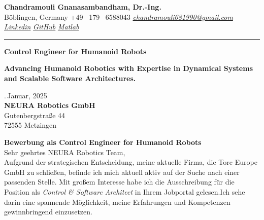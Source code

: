 \documentclass[a4paper,10pt]{article}
\newcommand{\link}[1]{{\textit{#1}}}
\begin{document}
\thispagestyle{plain}

\begin{center}
    {\Large \textbf{Chandramouli Gnanasambandham, Dr.-Ing.}}\\ 
    
    \vspace{0.2cm}
    \small B\"oblingen, Germany \hfill  \bullet  \hfill  +49 \ 179 \ 6588043 \hfill \bullet  \hfill
    \textup{\href{mailto:chandramouli681990@gmail.com}{\link{chandramouli681990@gmail.com}}} \hfill \bullet \hfill
    \textup{\href{https://linkedin.com/in/ganasambandhamc}{\link{Linkedin}}} \hfill \bullet \hfill
    \textup{\href{https://github.com/chandramouli6890}{\link{GitHub}}} \hfill \bullet \hfill
    \textup{\href{https://de.mathworks.com/matlabcentral/profile/authors/4267772}{\link{Matlab}}}

    \vspace{-0.2cm}
    {\rule{\linewidth}{0.8pt}}

    \vspace{0.2cm}
    {\Large \textbf{Control Engineer for Humanoid Robots}}
    
    \vspace{0.1cm}
    \colorbox{gray!40}{%
        \parbox{0.99\textwidth}{%
            \centering \textcolor{highlightcolor}{\textbf{Advancing Humanoid Robotics with Expertise in Dynamical Systems and Scalable Software Architectures.}}
        }%
    }
\end{center}

\vspace{0.5cm}
.\,Januar, 2025\\

{\noindent
    \textbf{NEURA Robotics GmbH}\\
Gutenbergstraße 44\\
72555 Metzingen\\ 
}

\noindent \textbf{Bewerbung als Control Engineer for Humanoid Robots} \\

\noindent Sehr geehrtes NEURA Robotics Team,\\

\noindent Aufgrund der strategischen Entscheidung, meine aktuelle Firma, die
Torc Europe GmbH zu schließen, befinde ich mich aktuell aktiv auf der Suche
nach einer passenden Stelle. Mit großem Interesse habe ich die Ausschreibung
für die Position als \textit{Control \& Software Architect} in Ihrem Jobportal
gelesen.Ich sehe darin eine spannende Möglichkeit, meine Erfahrungen und
Kompetenzen gewinnbringend einzusetzen. \\
\end{document}

